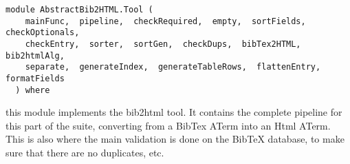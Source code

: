 \label{module:AbstractBib2HTML.Tool}
\haddockbeginheader
{\haddockverb\begin{verbatim}
module AbstractBib2HTML.Tool (
    mainFunc,  pipeline,  checkRequired,  empty,  sortFields,  checkOptionals, 
    checkEntry,  sorter,  sortGen,  checkDups,  bibTex2HTML,  bib2htmlAlg, 
    separate,  generateIndex,  generateTableRows,  flattenEntry,  formatFields
  ) where\end{verbatim}}
\haddockendheader

this module implements the bib2html tool. It contains the complete pipeline for
 this part of the suite, converting from a BibTex ATerm into an Html ATerm.
 This is also where the main validation is done on the BibTeX database, to make sure that there
 are no duplicates, etc. 
\par

